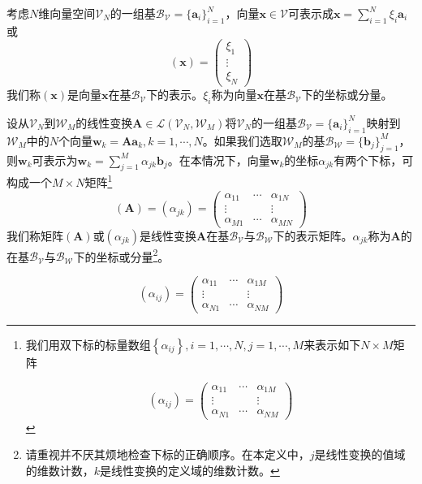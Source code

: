 \documentclass[main.tex]{subfiles}
\begin{document}
考虑$N$维向量空间$\mathcal{V}_N$的一组基$\mathcal{B}_\mathcal{V}=\{\mathbf{a}_i\}_{i=1}^N$，向量$\mathbf{x}\in\mathcal{V}$可表示成$\mathbf{x}=\sum_{i=1}^N\xi_i\mathbf{a}_i$或
\[\left(\mathbf{x}\right)=\left(\begin{array}{ccc}\xi_1\\\vdots\\\xi_N\end{array}\right)\]
我们称$\left(\mathbf{x}\right)$是向量$\mathbf{x}$在基$\mathcal{B}_\mathcal{V}$下的表示。$\xi_i$称为向量$\mathbf{x}$在基$\mathcal{B}_\mathcal{V}$下的坐标或分量。

设从$\mathcal{V}_N$到$\mathcal{W}_M$的线性变换$\mathbf{A}\in\mathcal{L}\left(\mathcal{V}_N,\mathcal{W}_M\right)$将$\mathcal{V}_N$的一组基$\mathcal{B}_\mathcal{V}=\{\mathbf{a}_i\}_{i=1}^N$映射到$\mathcal{W}_M$中的$N$个向量$\mathbf{w}_k=\mathbf{Aa}_k,k=1,\cdots,N$。如果我们选取$\mathcal{W}_M$的基$\mathcal{B}_\mathcal{W}=\{\mathbf{b}_j\}_{j=1}^M$，则$\mathbf{w}_k$可表示为$\mathbf{w}_k=\sum_{j=1}^M\alpha_{jk}\mathbf{b}_j$。在本情况下，向量$\mathbf{w}_k$的坐标$\alpha_{jk}$有两个下标，可构成一个$M\times N$矩阵\footnote{我们用双下标的标量数组$\left\{\alpha_{ij}\right\},i=1,\cdots,N,j=1,\cdots,M$来表示如下$N\times M$矩阵

\[\left(\alpha_{ij}\right)=\left(\begin{array}{ccc}\alpha_{11}&\cdots&\alpha_{1M}\\\vdots&&\vdots\\\alpha_{N1}&\cdots&\alpha_{NM}\end{array}\right)\]}
\[\left(\mathbf{A}\right)=\left(\alpha_{jk}\right)=\left(\begin{array}{ccc}\alpha_{11}&\cdots&\alpha_{1N}\\\vdots&&\vdots\\\alpha_{M1}&\cdots&\alpha_{MN}\end{array}\right)\]
我们称矩阵$\left(\mathbf{A}\right)$或$\left(\alpha_{jk}\right)$是线性变换$\mathbf{A}$在基$\mathcal{B}_\mathcal{V}$与$\mathcal{B}_\mathcal{W}$下的表示矩阵。$\alpha_{jk}$称为$\mathbf{A}$的在基$\mathcal{B}_\mathcal{V}$与$\mathcal{B}_\mathcal{W}$下的坐标或分量\footnote{请重视并不厌其烦地检查下标的正确顺序。在本定义中，$j$是线性变换的值域的维数计数，$k$是线性变换的定义域的维数计数。}。

\[\left(\alpha_{ij}\right)=\left(\begin{array}{ccc}\alpha_{11}&\cdots&\alpha_{1M}\\\vdots&&\vdots\\\alpha_{N1}&\cdots&\alpha_{NM}\end{array}\right)\]
\end{document}
